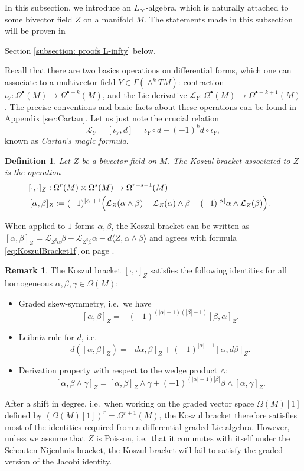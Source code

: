 \documentclass[11pt,thmsa]{amsart}
\newtheorem{definition}[theorem]{Definition}
\theoremstyle{definition}
\newtheorem{remark}[theorem]{Remark}
\newcommand{\Lie}{\mathcal{L}}
\begin{document}
In this subsection, we introduce an $L_\infty$-algebra, which is naturally attached to some bivector field $Z$ on a manifold $M$. The statements made in this subsection will be proven in {Section
\ref{subsection: proofs L-infty} below.

 
Recall that there are two basics operations on differential forms, which one can associate to a multivector field $Y\in \Gamma(\wedge^k TM)$:
contraction $\iota_Y: \Omega^\bullet(M)\to \Omega^{\bullet-k}(M)$, and the Lie derivative $\Lie_Y: \Omega^\bullet(M) \to \Omega^{\bullet-k+1}(M)$.
The precise conventions and basic facts about these operations can be found in Appendix \ref{sec:Cartan}. Let us just note the crucial relation
$$ \Lie_Y = [\iota_Y,d]=\iota_Y \circ d - (-1)^{k} d \circ \iota_Y, $$
known as {\em Cartan's magic formula}.


\begin{definition}\label{definition: Koszul bracket of bivector field}
Let $Z$ be a bivector field on $M$. The {\em Koszul bracket} associated to $Z$ is the operation
\begin{eqnarray*}
 & [\cdot,\cdot]_Z: \Omega^r(M) \times \Omega^s(M) \to \Omega^{r+s-1}(M) &\\
 &\, [\alpha,\beta]_Z:=(-1)^{|\alpha|+1} {\Big{(}}\Lie_Z(\alpha\wedge \beta)-\Lie_Z(\alpha)\wedge \beta - (-1)^{|\alpha|}\alpha \wedge \Lie_Z(\beta){\Big{)}}.&
 \end{eqnarray*}
\end{definition}


When applied to $1$-forms $\alpha,\beta$, the Koszul bracket can be written as
$[\alpha,\beta]_Z=\Lie_{Z^{\sharp}\alpha} \beta -\Lie_{Z^{\sharp}\beta} \alpha-d\langle Z, \alpha\wedge \beta\rangle$ and agrees with formula \eqref{eq:KoszulBracket1f} on page \pageref{eq:KoszulBracket1f}.


\begin{remark}\label{rem:Kos2der}
The Koszul bracket $[\cdot,\cdot]_Z$ satisfies the following identities for all homogeneous $\alpha,\beta,\gamma \in \Omega(M)$:
\begin{itemize}
\item Graded skew-symmetry, i.e.~we have
$$[\alpha,\beta]_Z = -(-1)^{(|\alpha|-1)(|\beta|-1)}[\beta,\alpha]_Z.$$
\item Leibniz rule for $d$, i.e.
$$ d([\alpha,\beta]_Z)=[d\alpha,\beta]_Z + (-1)^{|\alpha|-1} [\alpha,d\beta]_Z.$$
\item Derivation property with respect to the wedge product $\wedge$:
$$ [\alpha,\beta\wedge \gamma]_Z = [\alpha,\beta]_Z\wedge \gamma + (-1)^{(|\alpha|-1)|\beta|}\beta \wedge [\alpha,\gamma]_Z.$$
\end{itemize}
After a shift in degree, i.e.~when working on the graded vector space $\Omega(M)[1]$ defined by $(\Omega(M)[1])^r=\Omega^{r+1}(M)$, the Koszul bracket therefore satisfies most of the identities required from a differential graded Lie algebra.
However, unless we assume that $Z$ is Poisson, i.e.~that it commutes with itself under the Schouten-Nijenhuis bracket, the Koszul bracket will fail to satisfy the graded version of the Jacobi identity.
\end{remark}

}
\end{document}
